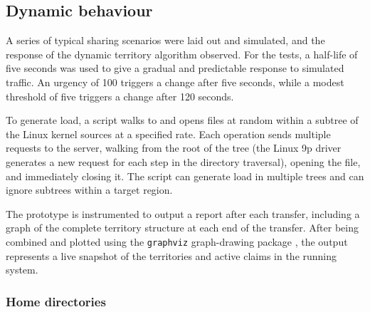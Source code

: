 \subsection{Dynamic behaviour}

A series of typical sharing scenarios were laid out and simulated, and the response of the dynamic territory algorithm observed. For the tests, a half-life of five seconds was used to give a gradual and predictable response to simulated traffic. An urgency of 100 triggers a change after five seconds, while a modest threshold of five triggers a change after 120 seconds.

To generate load, a script walks to and opens files at random within a subtree of the Linux kernel sources at a specified rate. Each operation sends multiple requests to the server, walking from the root of the tree (the Linux 9p driver generates a new request for each step in the directory traversal), opening the file, and immediately closing it. The script can generate load in multiple trees and can ignore subtrees within a target region.

The prototype is instrumented to output a report after each transfer, including a graph of the complete territory structure at each end of the transfer. After being combined and plotted using the \texttt{graphviz} graph-drawing package \cite{gansner}, the output represents a live snapshot of the territories and active claims in the running system.

\subsubsection{Home directories}


